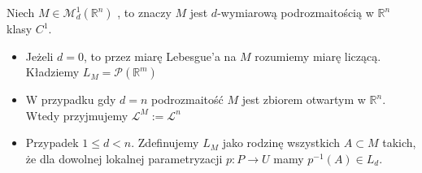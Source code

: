 \begin{defi}
    Niech $M \in \mathcal{M}_d^1(\mathbb{R}^n)$ , to znaczy $M$ jest $d$-wymiarową podrozmaitością w $\mathbb{R}^n$ klasy $C^1$.
    \begin{itemize}
        \item Jeżeli $d=0$, to przez miarę Lebesgue'a na $M$ rozumiemy miarę liczącą. Kładziemy $L_M = \mathcal{P}(\mathbb{R}^m)$
        \item W przypadku gdy $d=n$ podrozmaitość $M$ jest zbiorem otwartym w $\mathbb{R}^n$. Wtedy przyjmujemy $\mathcal{L}^M := \mathcal{L}^n$
        \item Przypadek $1 \leq d < n$. Zdefinujemy $L_M$ jako rodzinę wszystkich $A \subset M$ takich, że dla dowolnej lokalnej parametryzacji $p : P \rightarrow U$ mamy $p^{-1}(A) \in L_d$. 
    \end{itemize}
\end{defi}